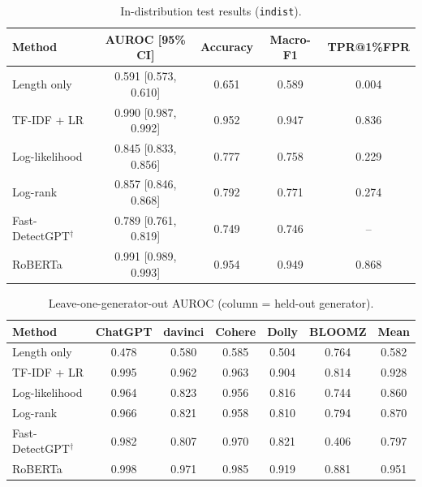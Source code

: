 \documentclass{nle}
\begin{document}
\begin{table}
  \caption{In-distribution test results (\texttt{indist}).}
  \begin{tabular}{lcccc}
  \hline\hline
  Method & AUROC [95\% CI] & Accuracy & Macro-F1 & TPR@1\%FPR \\
  \hline
  Length only                & 0.591 [0.573, 0.610] & 0.651 & 0.589 & 0.004 \\
  TF-IDF + LR                & 0.990 [0.987, 0.992] & 0.952 & 0.947 & 0.836 \\
  Log-likelihood             & 0.845 [0.833, 0.856] & 0.777 & 0.758 & 0.229 \\
  Log-rank                   & 0.857 [0.846, 0.868] & 0.792 & 0.771 & 0.274 \\
  Fast-DetectGPT$^\dagger$   & 0.789 [0.761, 0.819] & 0.749 & 0.746 & -- \\
  RoBERTa                    & 0.991 [0.989, 0.993] & 0.954 & 0.949 & 0.868 \\
  \hline\hline
  \end{tabular}
  \label{tab:indist}
\end{table}

\begin{table}
  \caption{Leave-one-generator-out AUROC (column = held-out generator).}
  \begin{tabular}{lcccccc}
  \hline\hline
  Method & ChatGPT & davinci & Cohere & Dolly & BLOOMZ & Mean \\
  \hline
  Length only                & 0.478 & 0.580 & 0.585 & 0.504 & 0.764 & 0.582 \\
  TF-IDF + LR                & 0.995 & 0.962 & 0.963 & 0.904 & 0.814 & 0.928 \\
  Log-likelihood             & 0.964 & 0.823 & 0.956 & 0.816 & 0.744 & 0.860 \\
  Log-rank                   & 0.966 & 0.821 & 0.958 & 0.810 & 0.794 & 0.870 \\
  Fast-DetectGPT$^\dagger$   & 0.982 & 0.807 & 0.970 & 0.821 & 0.406 & 0.797 \\
  RoBERTa                    & 0.998 & 0.971 & 0.985 & 0.919 & 0.881 & 0.951 \\
  \hline\hline
  \end{tabular}
  \label{tab:logo}
\end{table}
\end{document}
